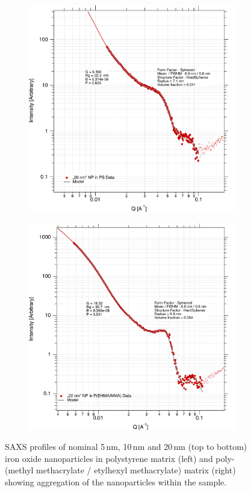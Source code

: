 \begin{figure}
	\begin{subfigure}[b]{0.42\textwidth}
		\includegraphics[width=\linewidth]{images/ps20.pdf}
	\end{subfigure}
	\begin{subfigure}[b]{0.42\textwidth}
	\includegraphics[width=\linewidth]{images/pmma20.pdf}
	\end{subfigure}
	\caption[SAXS profile of iron oxide nanoparticles in polymer matrices]{SAXS profiles of nominal 5\,nm, 10\,nm and 20\,nm (top to bottom) iron oxide nanoparticles in polystyrene matrix (left) and poly-(methyl methacrylate / etylhexyl methacrylate) matrix (right) showing aggregation of the nanoparticles within the sample.}
	\label{fig:saxsps}
\end{figure}

